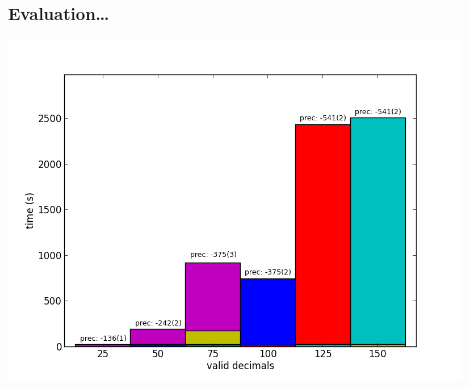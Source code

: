 \documentclass[handout,xcolor=pdftex,dvipsnames,table]{beamer}
\begin{document}
\addtocounter{framenumber}{-1}
\begin{frame}
  \frametitle{Evaluation\dots}
  \includegraphics[width=0.9\textwidth]{sin_for_series_4_dep_on_n}
\end{frame}
\addtocounter{framenumber}{-1}
\end{document}
